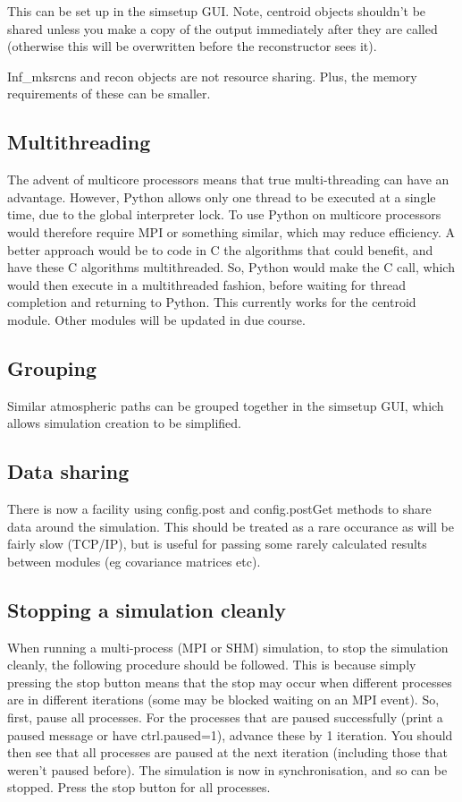 \documentclass{article}
\begin{document}
This can be set up in the simsetup GUI.  Note, centroid objects
shouldn't be shared unless you make a copy of the output immediately
after they are called (otherwise this will be overwritten before the
reconstructor sees it).

Inf\_mksrcns and recon objects are not resource sharing.  Plus, the
memory requirements of these can be smaller.

\subsection{Multithreading}
The advent of multicore processors means that true multi-threading can
have an advantage.  However, Python allows only one thread to be
executed at a single time, due to the global interpreter lock.  To use
Python on multicore processors would therefore require MPI or
something similar, which may reduce efficiency.  A better approach
would be to code in C the algorithms that could benefit, and have
these C algorithms multithreaded.  So, Python would make the C call,
which would then execute in a multithreaded fashion, before waiting
for thread completion and returning to Python.  This currently works
for the centroid module.  Other modules will be updated in due course.

\subsection{Grouping}
Similar atmospheric paths can be grouped together in the simsetup GUI,
which allows simulation creation to be simplified.

\subsection{Data sharing}
There is now a facility using config.post and config.postGet methods
to share data around the simulation.  This should be treated as a rare
occurance as will be fairly slow (TCP/IP), but is useful for passing
some rarely calculated results between modules (eg covariance matrices
etc).

\subsection{Stopping a simulation cleanly}
When running a multi-process (MPI or SHM) simulation, to stop the
simulation cleanly, the following procedure should be followed.  This
is because simply pressing the stop button means that the stop may
occur when different processes are in different iterations (some may
be blocked waiting on an MPI event).  So, first, pause all
processes.  For the processes that are paused successfully (print a
paused message or have ctrl.paused=1), advance these by 1 iteration.
You should then see that all processes are paused at the next
iteration (including those that weren't paused before).  The
simulation is now in synchronisation, and so can be stopped.  Press
the stop button for all processes.
\end{document}

